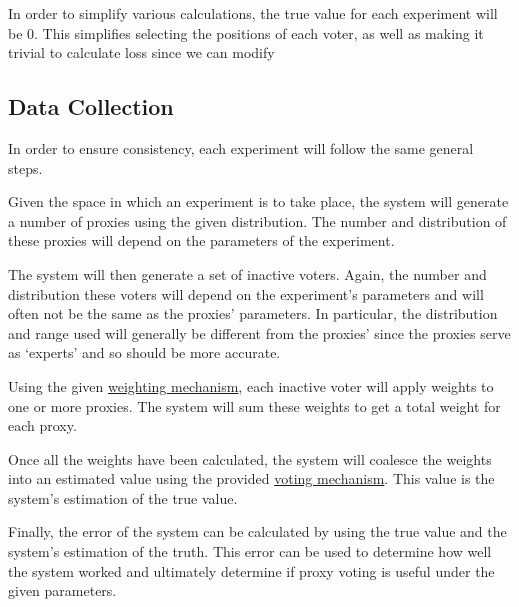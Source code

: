 In order to simplify various calculations, the true value for each experiment
will be 0.
This simplifies selecting the positions of each voter, as well as making it
trivial to calculate loss since we can modify


\subsection{Data Collection}\label{subsec:data-collection}
In order to ensure consistency, each experiment will follow the same general
steps.

\begin{enumerate}[label=\textbf{\arabic*}., leftmargin=2\parindent]
    Given the space in which an experiment is to take place, the system will
    generate a number of proxies using the given distribution.
    The number and distribution of these proxies will depend on the
    parameters of the experiment.

    The system will then generate a set of inactive voters.
    Again, the number and distribution these voters will depend on the
    experiment's parameters and will often not be the same as the proxies'
    parameters.
    In particular, the distribution and range used will generally be
    different from the proxies' since the proxies serve as `experts' and so
    should be more accurate.

    Using the given \hyperref[subsec:weight-mechanisms]{weighting mechanism},
    each inactive voter will apply weights to one or more proxies.
    The system will sum these weights to get a total weight for each proxy.

    Once all the weights have been calculated, the system will coalesce
    the weights into an estimated value using the provided
    \hyperref[subsec:voting-mechanisms]{voting mechanism}.
    This value is the system's estimation of the true value.

    Finally, the error of the system can be calculated by using the true
    value and the system's estimation of the truth.
    This error can be used to determine how well the system worked and
    ultimately determine if proxy voting is useful under the given parameters.
\end{enumerate}

